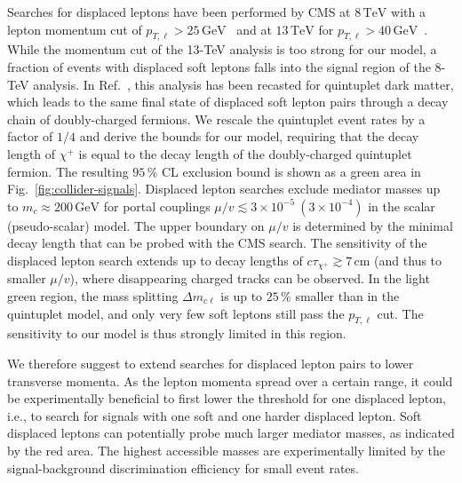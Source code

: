 \documentclass[nofootinbib,prd,aps,superscriptaddress,preprintnumbers]{revtex4}
\begin{document}
Searches for displaced leptons have been performed by CMS at $8\,\text{TeV}$ with a lepton momentum cut of $p_{T,\ell} > 25\,\text{GeV}$~\cite{Khachatryan:2014mea} and at $13\,\text{TeV}$ for $p_{T,\ell} > 40\,\text{GeV}$~\cite{CMS:2016isf}. While the momentum cut of the 13-TeV analysis is too strong for our model, a fraction of events with displaced soft leptons falls into the signal region of the 8-TeV analysis. In Ref.~\cite{Bharucha:2018pfu}, this analysis has been recasted for quintuplet dark matter, which leads to the same final state of displaced soft lepton pairs through a decay chain of doubly-charged fermions. We rescale the quintuplet event rates by a factor of $1/4$ and derive the bounds for our model, requiring that the decay length of $\chi^+$ is equal to the decay length of the doubly-charged quintuplet fermion. The resulting $95\,\%$ CL exclusion bound is shown as a green area in Fig.~\ref{fig:collider-signals}. Displaced lepton searches exclude mediator masses up to $m_c \approx 200\,\text{GeV}$ for portal couplings $\mu/v \lesssim 3\times 10^{-5}\ (3\times 10^{-4})$ in the scalar (pseudo-scalar) model. The upper boundary on $\mu/v$ is determined by the minimal decay length that can be probed with the CMS search. The sensitivity of the displaced lepton search extends up to decay lengths of $c\tau_{\chi^+} \gtrsim 7\,\text{cm}$ (and thus to smaller $\mu/v$), where disappearing charged tracks can be observed. In the light green region, the mass splitting $\Delta m_{c\ell}$ is up to $25\,\%$ smaller than in the quintuplet model, and only very few soft leptons still pass the $p_{T,\ell}$ cut. The sensitivity to our model is thus strongly limited in this region.

We therefore suggest to extend searches for displaced lepton pairs to lower transverse momenta. As the lepton momenta spread over a certain range, it could be experimentally beneficial to first lower the threshold for one displaced lepton, i.e., to search for signals with one soft and one harder displaced lepton. Soft displaced leptons can potentially probe much larger mediator masses, as indicated by the red area. The highest accessible masses are experimentally limited by the signal-background discrimination efficiency for small event rates.
\end{document}
